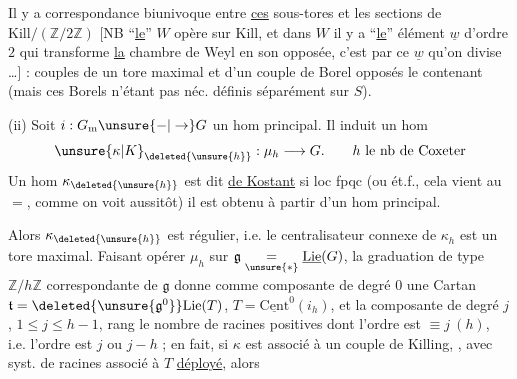 Il y a correspondance biunivoque entre \uline{ces} sous-tores et les sections de $\mathrm{Kill}/(\mathbb Z/2\mathbb Z)$ [NB ``\uline{le}'' $W$ opère sur $\mathrm{Kill}$, et dans $W$ il y a ``\uline{le}'' élément $\underline w$ d'ordre $2$ qui transforme \uline{la}  chambre de Weyl en son opposée, c'est par ce $\underline w$ qu'on divise \ldots] : couples de un tore maximal et d'un couple de Borel opposés le contenant (mais ces Borels n'étant pas néc. définis séparément sur $S$).

(ii) Soit $i:G_{\mathrm m}\unsure{-|\to}G$ un hom principal. Il induit un hom
\[
\unsure{\kappa|K}_{\deleted{\unsure{h}}}:\mu_h\longrightarrow G.\qquad h\ \text{le nb de Coxeter}
\]
Un hom $\kappa_{\deleted{\unsure{h}}}$ est dit  \uline{de Kostant} si loc fpqc (ou ét.f., cela vient au $=$, comme on voit aussitôt) il est obtenu à partir d'un hom principal.

 Alors $\kappa_{\deleted{\unsure{h}}}$ est régulier, i.e. le centralisateur connexe de $\kappa_h$ est un tore maximal. Faisant opérer $\mu_h$ sur $\mathfrak g\mathrel{\underset{\unsure{*}}{=}}\underline{\mathrm{Lie}}(G)$, la graduation de type $\mathbb Z/h\mathbb Z$ correspondante de $\mathfrak g$ donne comme composante de degré $0$ une  Cartan $\mathfrak t=\deleted{\unsure{\mathfrak g^0}}\mathrm{Lie}(T)$, $T=\underline{\mathrm{Cent}}^{0}(i_h)$, et la composante de degré $j$, $1\leq j\leq h-1$,  rang le nombre de racines positives dont l'ordre est $\equiv j\ (h)$, i.e.  l'ordre est $j$ ou $j-h$ ; en fait, si $\kappa$ est associé à un couple de Killing, ,  avec syst. de racines associé à $T$ \uline{déployé}, alors

